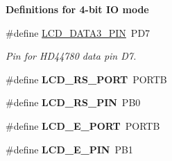 \begin{Indent}{\bf Definitions for 4-\/bit IO mode}
\begin{DoxyCompactItemize}
\#define \hyperlink{a00007_ga54032ce0050853e181f879b69fec4370}{L\+C\+D\+\_\+\+D\+A\+T\+A3\+\_\+\+P\+IN}~P\+D7
\begin{DoxyCompactList}\small\item\em Pin for H\+D44780 data pin D7. \end{DoxyCompactList}\item 
\#define {\bfseries L\+C\+D\+\_\+\+R\+S\+\_\+\+P\+O\+RT}~P\+O\+R\+TB
\item 
\#define {\bfseries L\+C\+D\+\_\+\+R\+S\+\_\+\+P\+IN}~P\+B0
\item 
\#define {\bfseries L\+C\+D\+\_\+\+E\+\_\+\+P\+O\+RT}~P\+O\+R\+TB
\item 
\#define {\bfseries L\+C\+D\+\_\+\+E\+\_\+\+P\+IN}~P\+B1
\end{DoxyCompactItemize}
\end{Indent}
